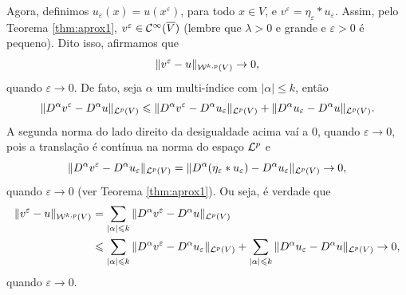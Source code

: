 \begin{prf}
    Agora, definimos $u_\varepsilon(x) = u(x^\varepsilon)$, para todo $x \in V$, e $v^\varepsilon = \eta_\varepsilon * u_\varepsilon$. Assim, pelo Teorema \ref{thm:aprox1}, $v^\varepsilon \in \mathcal{C}^{\infty}(\overline{V})$ (lembre que $\lambda > 0$ e grande e $\varepsilon > 0$ é pequeno). 
    Dito isso, afirmamos que
    \[
        \Vert v^\varepsilon - u \Vert_{\mathcal{W}^{k,p}(V)} \to 0,
    \]
    quando $\varepsilon \to 0$.
    De fato, seja $\alpha $ um multi-índice com $|\alpha| \leqslant k$, então
    \[
        \Vert D^\alpha v^\varepsilon - D^\alpha u \Vert_{\mathcal{L}^p(V)} \leqslant \Vert D^\alpha v^\varepsilon - D^\alpha u_\varepsilon \Vert_{\mathcal{L}^p(V)} + \Vert D^\alpha u_\varepsilon - D^\alpha u \Vert_{\mathcal{L}^p(V)}.
    \]
   A segunda norma do lado direito da desigualdade acima vaí a $0$, quando $\varepsilon \to 0$, pois a translação é contínua na norma do espaço $\mathcal{L}^p$ e
    \[
        \Vert D^\alpha v^\varepsilon - D^\alpha u_\varepsilon \Vert_{\mathcal{L}^p(V)} = \Vert D^\alpha (\eta_\varepsilon * u_\varepsilon) - D^\alpha u_\varepsilon \Vert_{\mathcal{L}^p(V)} \to 0,
    \]
    quando $\varepsilon \to 0$ (ver Teorema \ref{thm:aprox1}). Ou seja, é verdade que
    \[
        \begin{aligned}
            \Vert v^\varepsilon - u \Vert_{\mathcal{W}^{k,p}(V)} &= \sum_{|\alpha| \leqslant k} \Vert D^\alpha v^\varepsilon - D^\alpha u \Vert_{\mathcal{L}^p(V)} \\
            &\leqslant \sum_{|\alpha| \leqslant k} \Vert D^\alpha v^\varepsilon - D^\alpha u_\varepsilon \Vert_{\mathcal{L}^p(V)} + \sum_{|\alpha| \leqslant k} \Vert D^\alpha u_\varepsilon - D^\alpha u \Vert_{\mathcal{L}^p(V)} \to 0,
        \end{aligned}
    \]
    quando $\varepsilon \to 0$.


\end{prf}
